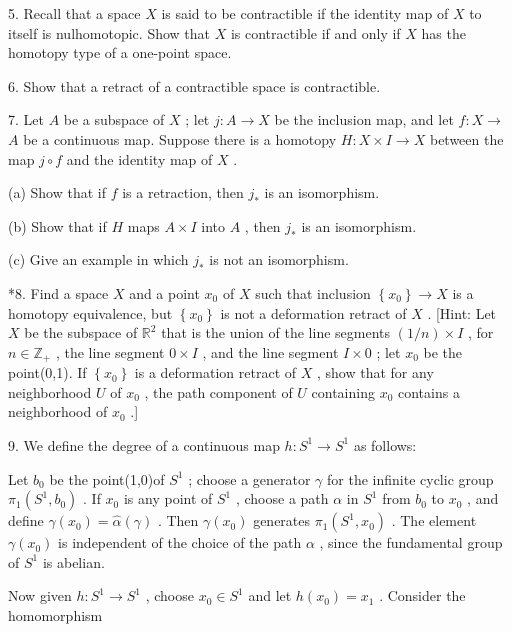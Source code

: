 5. Recall that a space \(X\) is said to be contractible if the identity map of \(X\) to itself is nulhomotopic. Show that \(X\) is contractible if and only if \(X\) has the homotopy type of a one-point space.

6. Show that a retract of a contractible space is contractible.

7. Let \(A\) be a subspace of \(X\) ; let \(j : A \rightarrow  X\) be the inclusion map, and let \(f : X \rightarrow\)  \(A\) be a continuous map. Suppose there is a homotopy \(H : X \times  I \rightarrow  X\) between the map \(j \circ  f\) and the identity map of \(X\) .

(a) Show that if \(f\) is a retraction, then \({j}_{ * }\) is an isomorphism.

(b) Show that if \(H\) maps \(A \times  I\) into \(A\) , then \({j}_{ * }\) is an isomorphism.

(c) Give an example in which \({j}_{ * }\) is not an isomorphism.

*8. Find a space \(X\) and a point \({x}_{0}\) of \(X\) such that inclusion \(\left\{  {x}_{0}\right\}   \rightarrow  X\) is a homotopy equivalence, but \(\left\{  {x}_{0}\right\}\) is not a deformation retract of \(X\) . [Hint: Let \(X\) be the subspace of \({\mathbb{R}}^{2}\) that is the union of the line segments \(\left( {1/n}\right)  \times  I\) , for \(n \in  {\mathbb{Z}}_{ + }\) , the line segment \(0 \times  I\) , and the line segment \(I \times  0\) ; let \({x}_{0}\) be the point(0,1). If \(\left\{  {x}_{0}\right\}\) is a deformation retract of \(X\) , show that for any neighborhood \(U\) of \({x}_{0}\) , the path component of \(U\) containing \({x}_{0}\) contains a neighborhood of \({x}_{0}\) .]

9. We define the degree of a continuous map \(h : {S}^{1} \rightarrow  {S}^{1}\) as follows:

Let \({b}_{0}\) be the point(1,0)of \({S}^{1}\) ; choose a generator \(\gamma\) for the infinite cyclic group \({\pi }_{1}\left( {{S}^{1},{b}_{0}}\right)\) . If \({x}_{0}\) is any point of \({S}^{1}\) , choose a path \(\alpha\) in \({S}^{1}\) from \({b}_{0}\) to \({x}_{0}\) , and define \(\gamma \left( {x}_{0}\right)  = \widehat{\alpha }\left( \gamma \right)\) . Then \(\gamma \left( {x}_{0}\right)\) generates \({\pi }_{1}\left( {{S}^{1},{x}_{0}}\right)\) . The element \(\gamma \left( {x}_{0}\right)\) is independent of the choice of the path \(\alpha\) , since the fundamental group of \({S}^{1}\) is abelian.

Now given \(h : {S}^{1} \rightarrow  {S}^{1}\) , choose \({x}_{0} \in  {S}^{1}\) and let \(h\left( {x}_{0}\right)  = {x}_{1}\) . Consider the homomorphism

